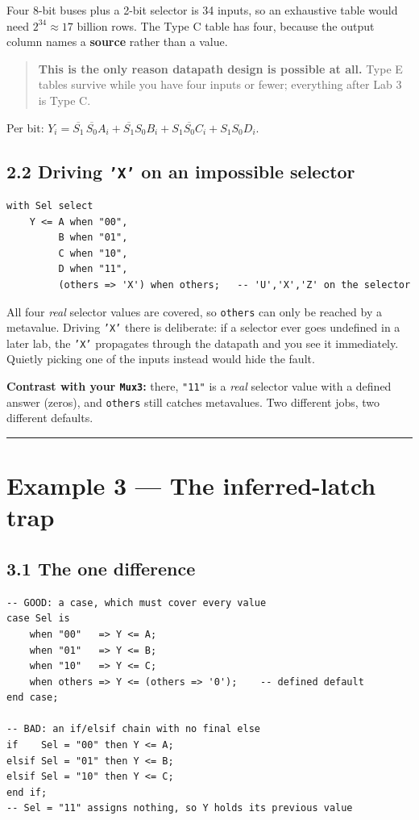 \documentclass[11pt]{article}
\newcommand{\code}[1]{\texttt{#1}}
\newcommand{\hr}{\vspace{2pt}\hrule\vspace{6pt}}
\begin{document}
Four 8-bit buses plus a 2-bit selector is 34 inputs, so an exhaustive table would
need $2^{34} \approx 17$ billion rows. The Type C table has four, because the
output column names a \textbf{source} rather than a value.

\begin{quote}
\textbf{This is the only reason datapath design is possible at all.} Type E tables
survive while you have four inputs or fewer; everything after Lab 3 is Type C.
\end{quote}

Per bit: $Y_i = \overline{S_1}\,\overline{S_0}A_i + \overline{S_1}S_0 B_i
+ S_1\overline{S_0}C_i + S_1 S_0 D_i$.

\subsection*{2.2 Driving \code{'X'} on an impossible selector}

\begin{lstlisting}
with Sel select
    Y <= A when "00",
         B when "01",
         C when "10",
         D when "11",
         (others => 'X') when others;   -- 'U','X','Z' on the selector
\end{lstlisting}

All four \emph{real} selector values are covered, so \code{others} can only be
reached by a metavalue. Driving \code{'X'} there is deliberate: if a selector ever
goes undefined in a later lab, the \code{'X'} propagates through the datapath and
you see it immediately. Quietly picking one of the inputs instead would hide the
fault.

\textbf{Contrast with your \code{Mux3}:} there, \code{"11"} is a \emph{real}
selector value with a defined answer (zeros), and \code{others} still catches
metavalues. Two different jobs, two different defaults.

\vspace{4pt}\hr

\section*{Example 3 --- The inferred-latch trap}

\subsection*{3.1 The one difference}

\begin{lstlisting}
-- GOOD: a case, which must cover every value
case Sel is
    when "00"   => Y <= A;
    when "01"   => Y <= B;
    when "10"   => Y <= C;
    when others => Y <= (others => '0');    -- defined default
end case;

-- BAD: an if/elsif chain with no final else
if    Sel = "00" then Y <= A;
elsif Sel = "01" then Y <= B;
elsif Sel = "10" then Y <= C;
end if;
-- Sel = "11" assigns nothing, so Y holds its previous value
\end{lstlisting}
\end{document}
